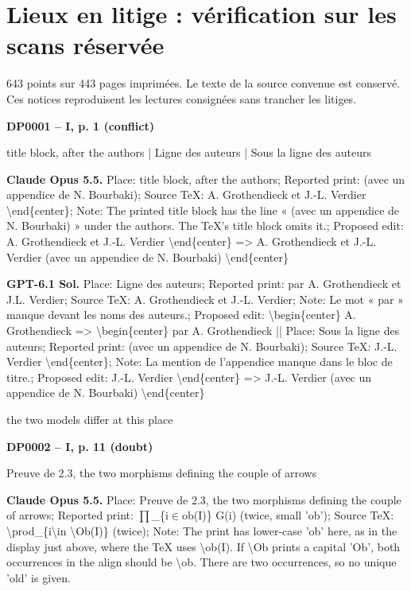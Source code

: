 \chapter*{Lieux en litige : vérification sur les scans réservée}
643 points sur 443 pages imprimées. Le texte de la source convenue est conservé. Ces notices reproduisent les lectures consignées sans trancher les litiges.
\begingroup\small\raggedright\sloppy\setlength{\parskip}{4pt}
\par\noindent\hypertarget{DP0001}{}\textbf{DP0001 -- I, p. 1 (conflict)}\par
title block, after the authors | Ligne des auteurs | Sous la ligne des auteurs\par
\textbf{Claude Opus 5.5.} Place: title block, after the authors; Reported print: (avec un appendice de N. Bourbaki); Source TeX: A. Grothendieck et J.-L. Verdier \textbackslash{}end\{center\}; Note: The printed title block has the line « (avec un appendice de N. Bourbaki) » under the authors. The TeX's title block omits it.; Proposed edit: A. Grothendieck et J.-L. Verdier \textbackslash{}end\{center\} =\allowbreak > A. Grothendieck et J.-L. Verdier  (avec un appendice de N. Bourbaki) \textbackslash{}end\{center\}\par
\textbf{GPT-6.1 Sol.} Place: Ligne des auteurs; Reported print: par A. Grothendieck et J.L. Verdier; Source TeX: A. Grothendieck et J.-L. Verdier; Note: Le mot « par » manque devant les noms des auteurs.; Proposed edit: \textbackslash{}begin\{center\} A. Grothendieck =\allowbreak > \textbackslash{}begin\{center\} par A. Grothendieck || Place: Sous la ligne des auteurs; Reported print: (avec un appendice de N. Bourbaki); Source TeX: J.-L. Verdier \textbackslash{}end\{center\}; Note: La mention de l'appendice manque dans le bloc de titre.; Proposed edit: J.-L. Verdier \textbackslash{}end\{center\} =\allowbreak > J.-L. Verdier  (avec un appendice de N. Bourbaki) \textbackslash{}end\{center\}\par
the two models differ at this place\par
\par\noindent\hypertarget{DP0002}{}\textbf{DP0002 -- I, p. 11 (doubt)}\par
Preuve de 2.3, the two morphisms defining the couple of arrows\par
\textbf{Claude Opus 5.5.} Place: Preuve de 2.3, the two morphisms defining the couple of arrows; Reported print: \ensuremath{\prod}\_\{i\ensuremath{\in}ob(I)\} G(i) (twice, small 'ob'); Source TeX: \textbackslash{}prod\_\{i\textbackslash{}in \textbackslash{}Ob(I)\} (twice); Note: The print has lower-case 'ob' here, as in the display just above, where the TeX uses \textbackslash{}ob(I). If \textbackslash{}Ob prints a capital 'Ob', both occurrences in the align should be \textbackslash{}ob. There are two occurrences, so no unique 'old' is given.\par
